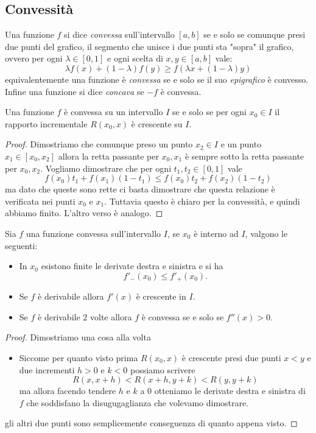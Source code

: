 \documentclass[11pt]{scrartcl}
\begin{document}
	\subsection{Convessità}
	\begin{definition}[Convessità]
		Una funzione $f$ si dice \textit{convessa} sull'intervallo $[a,b]$ se e solo se comunque presi due punti del grafico, il segmento che unisce i due punti sta "sopra" il grafico, ovvero per ogni $\lambda\in[0,1]$ e ogni scelta di $x,y\in [a,b]$ vale:
		$$\lambda f(x)+(1-\lambda)f(y)\ge f(\lambda x+(1-\lambda)y)$$
		equivalentemente una funzione è \textit{convessa} se e solo se il suo \textit{epigrafico} è convesso. Infine una funzione si dice \textit{concava} se $-f$ è convessa.
	\end{definition}
	\begin{proposition}
		Una funzione $f$ è convessa su un intervallo $I$ se e solo se per ogni $x_0\in I$ il rapporto incrementale $R(x_0,x)$ è crescente su $I$.
	\end{proposition}
	\begin{proof}
		Dimostriamo che comunque preso un punto $x_2\in I$ e un punto $x_1\in [x_0,x_2]$ allora la retta passante per $x_0,x_1$ è sempre sotto la retta passante per $x_0,x_2$. Vogliamo dimostrare che per ogni $t_1,t_2\in [0,1]$ vale
		$$f(x_0)t_1+f(x_1)(1-t_1)\le f(x_0)t_2+f(x_2)(1-t_2)$$
		ma dato che queste sono rette ci basta dimostrare che questa relazione è verificata nei punti $x_0$ e $x_1$. Tuttavia questo è chiaro per la convessità, e quindi abbiamo finito. L'altro verso è analogo.
	\end{proof}
	\begin{proposition}
		Sia $f$ una funzione convessa sull'intervallo $I$, se $x_0$ è interno ad $I$, valgono le seguenti:
		\begin{itemize}
			\item In $x_0$ esistono finite le derivate destra e sinistra e si ha $$f'_-(x_0)\le f'_+(x_0).$$
			\item Se $f$ è derivabile allora $f'(x)$ è crescente in $I$.
			\item Se $f$ è derivabile $2$ volte allora $f$ è convessa se e solo se $f''(x)>0$.
		\end{itemize}  
	\end{proposition}
	\begin{proof}
		Dimostriamo una cosa alla volta
		\begin{itemize}
			\item Siccome per quanto visto prima $R(x_0,x)$ è crescente presi due punti $x<y$ e due incrementi $h>0$ e $k<0$ possiamo scrivere
			$$R(x,x+h)<R(x+h,y+k)<R(y,y+k)$$
			ma allora facendo tendere $h$ e $k$ a $0$ otteniamo le derivate destra e sinistra di $f$ che soddisfano la disugugaglianza che volevamo dimostrare.
		\end{itemize}
		gli altri due punti sono semplicemente conseguenza di quanto appena visto.
	\end{proof}
\end{document}
